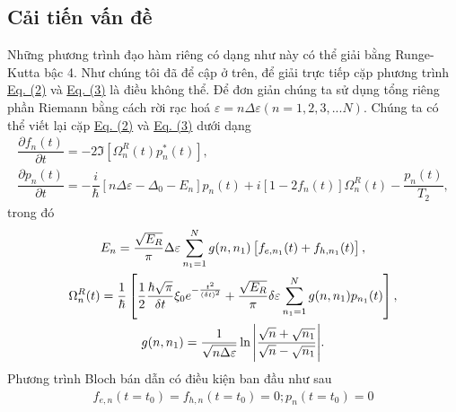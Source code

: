 \documentclass{article}
\newcommand{\f}[2]{\dfrac{#1}{#2}}
\begin{document}
\subsection{Cải tiến vấn đề}
Những phương trình đạo hàm riêng có dạng như này có thể giải bằng Runge-Kutta bậc 4. Như chúng tôi đã để cập ở trên, để giải trực tiếp cặp phương trình \hyperref[Eq:2]{Eq. (2)} và \hyperref[Eq:3]{Eq. (3)} là điều không thể. Để đơn giản chúng ta sử dụng tổng riêng phần Riemann bằng cách rời rạc hoá $\varepsilon = n \Delta \varepsilon(n = 1,2,3,... N)$. Chúng ta có thể viết lại cặp \hyperref[Eq:2]{Eq. (2)} và \hyperref[Eq:3]{Eq. (3)} dưới dạng
\begin{gather}
	\f{\partial f_{n} (t)}{\partial t} = - 2 \Im \left[ \Omega_{n}^{R}(t) p^{*}_{n}(t)\right], \label{Eq:4}\\
	\f{\partial p_{n}(t)}{\partial t} = - \f{i}{\hbar} \left[ n \Delta \varepsilon - \Delta_{0} - E_{n}  \right] p_{n}(t)
	+ i \left[ 1 - 2f_{n}(t) \right] \Omega_{n}^{R}(t) - \f{p_{n}(t)}{T_{2}}, \label{Eq:5}
\end{gather}
trong đó
\begin{gather}
	E_{n} = \f{\sqrt{E_{R}}}{\pi} \Delta \varepsilon \sum_{n_{1} = 1}^{N} g(n,n_{1}) \left[ f_{e,n_{1}} (t) + f_{h,n_{1}}(t) \right],\\
	\Omega_{n}^{R}(t) =\f{1}{\hbar} \left[ \f{1}{2} \f{\hbar \sqrt{\pi}}{\delta t} \xi_{0} e^{-\frac{t^{2}}{(\delta t)^{2}}} + \f{\sqrt{E_{R}}}{\pi} \delta \varepsilon \sum_{n_{1} = 1}^{N} g(n,n_{1}) p_{n_{1}}(t) \right],\\
	g(n,n_{1}) = \f{1}{\sqrt{n \Delta \varepsilon}} \ln \abs{\f{\sqrt{n} + \sqrt{n_{1}} }{\sqrt{n} - \sqrt{n_{1}}}}.
\end{gather}
Phương trình Bloch bán dẫn có điều kiện ban đầu như sau
\begin{align}
	f_{e,n}(t = t_{0}) = f_{h,n}(t = t_{0}) = 0 ; p_{n} (t = t_{0}) = 0 
\end{align}
\end{document}
